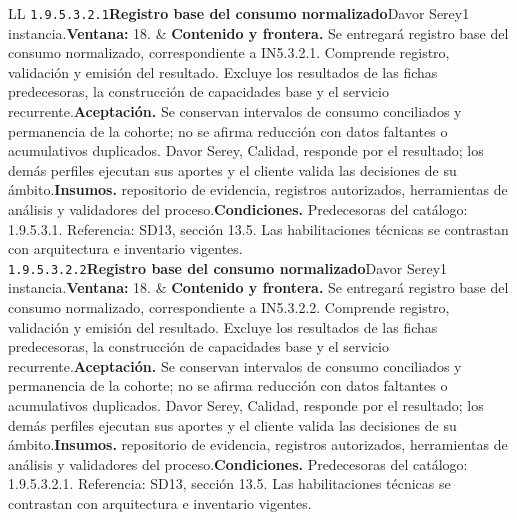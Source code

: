 \begin{longtable}{L{\tabcolsep\relax}L{\tabcolsep\relax}}
\texttt{1.\allowbreak{}9.\allowbreak{}5.\allowbreak{}3.\allowbreak{}2.\allowbreak{}1}\newline{}\textbf{Registro base del consumo normalizado}\newline{}Davor Serey\newline{}1 instancia.\newline{}\textbf{Ventana:} 18. & \textbf{Contenido y frontera.} Se entregará registro base del consumo normalizado, correspondiente a IN5.3.2.1. Comprende registro, validación y emisión del resultado. Excluye los resultados de las fichas predecesoras, la construcción de capacidades base y el servicio recurrente.\newline{}\textbf{Aceptación.} Se conservan intervalos de consumo conciliados y permanencia de la cohorte; no se afirma reducción con datos faltantes o acumulativos duplicados. Davor Serey, Calidad, responde por el resultado; los demás perfiles ejecutan sus aportes y el cliente valida las decisiones de su ámbito.\newline{}\textbf{Insumos.} repositorio de evidencia, registros autorizados, herramientas de análisis y validadores del proceso.\newline{}\textbf{Condiciones.} Predecesoras del catálogo: 1.9.5.3.1. Referencia: SD13, sección 13.5. Las habilitaciones técnicas se contrastan con arquitectura e inventario vigentes.\\\hline
\texttt{1.\allowbreak{}9.\allowbreak{}5.\allowbreak{}3.\allowbreak{}2.\allowbreak{}2}\newline{}\textbf{Registro base del consumo normalizado}\newline{}Davor Serey\newline{}1 instancia.\newline{}\textbf{Ventana:} 18. & \textbf{Contenido y frontera.} Se entregará registro base del consumo normalizado, correspondiente a IN5.3.2.2. Comprende registro, validación y emisión del resultado. Excluye los resultados de las fichas predecesoras, la construcción de capacidades base y el servicio recurrente.\newline{}\textbf{Aceptación.} Se conservan intervalos de consumo conciliados y permanencia de la cohorte; no se afirma reducción con datos faltantes o acumulativos duplicados. Davor Serey, Calidad, responde por el resultado; los demás perfiles ejecutan sus aportes y el cliente valida las decisiones de su ámbito.\newline{}\textbf{Insumos.} repositorio de evidencia, registros autorizados, herramientas de análisis y validadores del proceso.\newline{}\textbf{Condiciones.} Predecesoras del catálogo: 1.9.5.3.2.1. Referencia: SD13, sección 13.5. Las habilitaciones técnicas se contrastan con arquitectura e inventario vigentes.\\\hline

\end{longtable}
